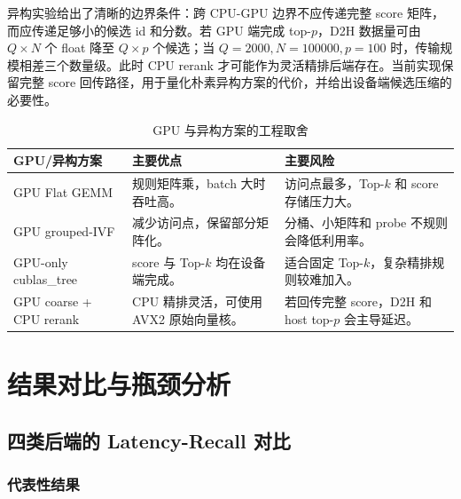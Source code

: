 \documentclass[a4paper,11pt,UTF8]{ctexart}
\begin{document}
异构实验给出了清晰的边界条件：跨 CPU-GPU 边界不应传递完整 score 矩阵，而应传递足够小的候选 id 和分数。若 GPU 端完成 top-$p$，D2H 数据量可由 $Q\times N$ 个 float 降至 $Q\times p$ 个候选；当 $Q=2000,N=100000,p=100$ 时，传输规模相差三个数量级。此时 CPU rerank 才可能作为灵活精排后端存在。当前实现保留完整 score 回传路径，用于量化朴素异构方案的代价，并给出设备端候选压缩的必要性。

\begin{table}[H]
  \centering\footnotesize
  \begin{tabularx}{\textwidth}{p{3.0cm}p{3.7cm}Y}
    \toprule
    GPU/异构方案 & 主要优点 & 主要风险 \\
    \midrule
    GPU Flat GEMM & 规则矩阵乘，batch 大时吞吐高。 & 访问点最多，Top-$k$ 和 score 存储压力大。 \\
    GPU grouped-IVF & 减少访问点，保留部分矩阵化。 & 分桶、小矩阵和 probe 不规则会降低利用率。 \\
    GPU-only cublas\_tree & score 与 Top-$k$ 均在设备端完成。 & 适合固定 Top-$k$，复杂精排规则较难加入。 \\
    GPU coarse + CPU rerank & CPU 精排灵活，可使用 AVX2 原始向量核。 & 若回传完整 score，D2H 和 host top-$p$ 会主导延迟。 \\
    \bottomrule
  \end{tabularx}
  \caption{GPU 与异构方案的工程取舍}
  \label{tab:gpu-tradeoff}
\end{table}



\section{结果对比与瓶颈分析}

\subsection{四类后端的 Latency-Recall 对比}

\subsubsection{代表性结果}
\end{document}

